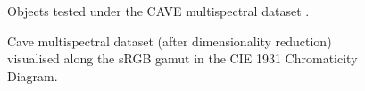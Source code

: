 \begin{figure}
    \centering
    \caption{Objects tested under the CAVE multispectral dataset \cite{CAVE_0293}.}
    \label{fig:cave}
\end{figure}

\begin{figure}
    \centering
    \caption{Cave multispectral dataset (after dimensionality reduction) visualised along the sRGB gamut in the CIE 1931 Chromaticity Diagram.}
    \label{fig:cave_gamut}
\end{figure}

